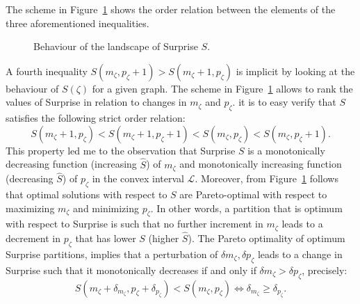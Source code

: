 The scheme in Figure~\ref{fig:surprisebehaviour} shows the order relation between the elements of the three aforementioned inequalities.
\begin{figure}[htb]
\centering
{}
\caption{Behaviour of the landscape of Surprise $S$.}
\label{fig:surprisebehaviour}
\end{figure}

A fourth inequality $S(m_\zeta,p_\zeta+1)>S(m_\zeta+1,p_\zeta)$ is implicit by looking at the behaviour of $S(\zeta)$ for a given graph. 
The scheme in Figure~\ref{fig:surprisebehaviour} allows to rank the values of Surprise in relation to changes in $m_\zeta$ and $p_\zeta$.
it is to easy verify that $S$ satisfies the following strict order relation:
\begin{equation}\label{eq:surpriseorderrelation}
S(m_\zeta+1,p_\zeta)<S(m_\zeta+1,p_\zeta+1)<S(m_\zeta,p_\zeta)<S(m_\zeta,p_\zeta+1).
\end{equation}
This property led me to the observation that Surprise $S$ is a monotonically decreasing function (increasing $\hat{S}$) of $m_\zeta$ and monotonically increasing function (decreasing $\hat{S}$) of $p_\zeta$ in the convex interval $\mathcal{L}$.
Moreover, from Figure~\ref{fig:surprisebehaviour} follows that optimal solutions with respect to $S$ are Pareto-optimal with respect to maximizing $m_\zeta$ and minimizing $p_\zeta$.
In other words, a partition that is optimum with respect to Surprise is such that no further increment in $m_\zeta$ leads to a decrement in $p_\zeta$ that has lower $S$ (higher $\hat{S}$).
The Pareto optimality of optimum Surprise partitions, implies that a perturbation of $\delta m_\zeta, \delta p_\zeta$ leads to a change in Surprise such that it monotonically decreases if and only if $\delta m_\zeta > \delta p_\zeta$, precisely:
\begin{equation}\label{eq:resolution_limit_condition}
S(m_\zeta + \delta_{m_\zeta}, p_\zeta + \delta_{p_\zeta}) < S(m_\zeta,p_\zeta) \iff \delta_{m_\zeta} \geq \delta_{p_\zeta}.
\end{equation}

